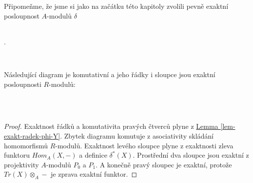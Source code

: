       Připomeňme, že jsme si jako na začátku této kapitoly zvolili pevně exaktní 
      posloupnost $A$-modulů $\delta$\\\\
      \centerline{.}\\
      
      \begin{thm}\label{mega-diagram}
        Následující diagram je komutativní a jeho řádky i sloupce jsou exaktní 
        posloupnosti $R$-modulů:\\\\
      \centerline{}\\
      \end{thm}
      \begin{proof}
        Exaktnost řádků a komutativita pravých čtverců plyne z 
        \hyperref[lem-exakt-radek-phi-Y]{Lemma \ref*{lem-exakt-radek-phi-Y}}. 
        Zbytek diagramu komutuje z asociativity skládání homomorfismů 
        $R$-modulů.
        Exaktnost levého sloupce plyne z exaktnosti zleva funktoru $Hom_A(X,-)$ a 
        definice $\delta^*(X)$. Prostřední dva sloupce jsou exaktní z 
        projektivity $A$-modulů $P_0$ a $P_1$. A konečně pravý sloupec je 
        exaktní, protože $Tr(X)\otimes_A-$ je zprava exaktní funktor.      
      \end{proof}
      
